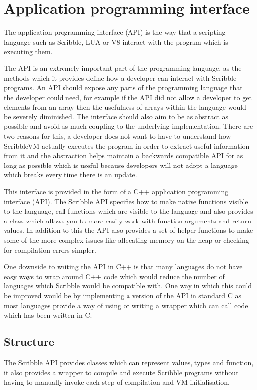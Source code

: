 \documentclass[]{final_report}
\begin{document}
\chapter{Application programming interface}

The application programming interface (API) is the way that a scripting language such as Scribble, LUA or V8 interact with the program which is executing them.

The API is an extremely important part of the programming language, as the methods which it provides define how a developer can interact with Scribble programs. An API should expose any parts of the programming language that the developer could need, for example if the API did not allow a developer to get elements from an array then the usefulness of arrays within the language would be severely diminished. The interface should also aim to be as abstract as possible and avoid as much coupling to the underlying implementation. There are two reasons for this, a developer does not want to have to understand how ScribbleVM actually executes the program in order to extract useful information from it and the abstraction helps maintain a backwards compatible API for as long as possible which is useful because developers will not adopt a language which breaks every time there is an update.

This interface is provided in the form of a C++ application programming interface (API). The Scribble API specifies how to make native functions visible to the language, call functions which are visible to the language and also provides a class which allows you to more easily work with function arguments and return values. In addition to this the API also provides a set of helper functions to make some of the more complex issues like allocating memory on the heap or checking for compilation errors simpler.

One downside to writing the API in C++ is that many languages do not have easy ways to wrap around C++ code which would reduce the number of languages which Scribble would be compatible with. One way in which this could be improved would be by implementing a version of the API in standard C as most languages provide a way of using or writing a wrapper which can call code which has been written in C.

\section{Structure}

The Scribble API provides classes which can represent values, types and function, it also provides a wrapper to compile and execute Scribble programs without having to manually invoke each step of compilation and VM initialisation.
\end{document}
